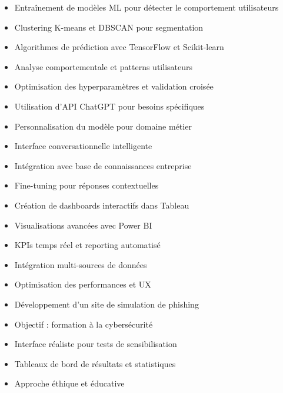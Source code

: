 \documentclass[10pt,a4paper,normalphoto]{altacv}
\begin{document}
\clearpage


\begin{itemize}
\item Entraînement de modèles ML pour détecter le comportement utilisateurs
\item Clustering K-means et DBSCAN pour segmentation
\item Algorithmes de prédiction avec TensorFlow et Scikit-learn
\item Analyse comportementale et patterns utilisateurs
\item Optimisation des hyperparamètres et validation croisée
\end{itemize}

\divider

\begin{itemize}
\item Utilisation d'API ChatGPT pour besoins spécifiques
\item Personnalisation du modèle pour domaine métier
\item Interface conversationnelle intelligente
\item Intégration avec base de connaissances entreprise
\item Fine-tuning pour réponses contextuelles
\end{itemize}

\divider

\begin{itemize}
\item Création de dashboards interactifs dans Tableau
\item Visualisations avancées avec Power BI
\item KPIs temps réel et reporting automatisé
\item Intégration multi-sources de données
\item Optimisation des performances et UX
\end{itemize}

\divider

\begin{itemize}
\item Développement d'un site de simulation de phishing
\item Objectif : formation à la cybersécurité
\item Interface réaliste pour tests de sensibilisation
\item Tableaux de bord de résultats et statistiques
\item Approche éthique et éducative
\end{itemize}
\end{document}
